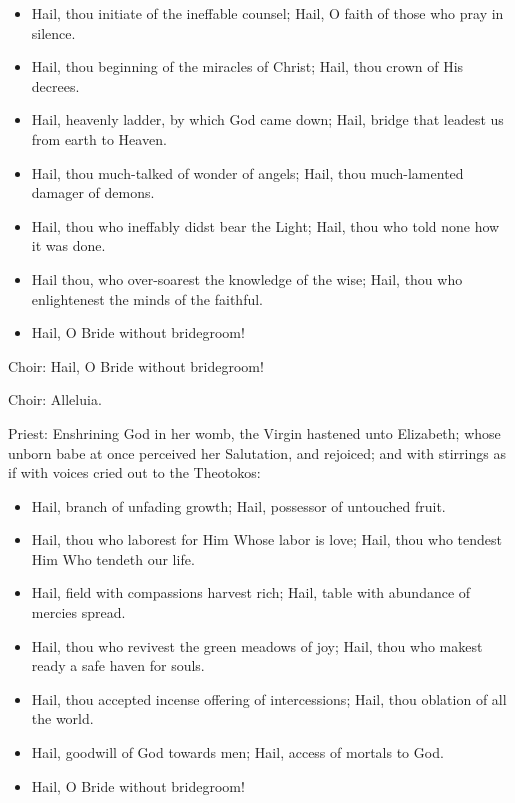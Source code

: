\documentclass[twoside, letterpaper, 12pt]{report}
\begin{document}
\begin{itemize}[label=\tiny{+},leftmargin=*]
\item Hail, thou initiate of the ineffable counsel; Hail, O faith of those who pray in silence.
\item Hail, thou beginning of the miracles of Christ; Hail, thou crown of His decrees.
\item Hail, heavenly ladder, by which God came down; Hail, bridge that leadest us from earth to
Heaven.
\item Hail, thou much-talked of wonder of angels; Hail, thou much-lamented damager of demons.
\item Hail, thou who ineffably didst bear the Light; Hail, thou who told none how it was done.
\item Hail thou, who over-soarest the knowledge of the wise; Hail, thou who enlightenest the minds
of the faithful.
\item Hail, O Bride without bridegroom! 
\end{itemize}

Choir: Hail, O Bride without bridegroom!


Choir: Alleluia. 

Priest: Enshrining God in her womb, the Virgin hastened unto Elizabeth; whose unborn babe
at once perceived her Salutation, and rejoiced; and with stirrings as if with voices cried
out to the Theotokos:

\begin{itemize}[label=\tiny{+},leftmargin=*]
\item Hail, branch of unfading growth; Hail, possessor of untouched fruit.
\item Hail, thou who laborest for Him Whose labor is love; Hail, thou who tendest Him Who tendeth
our life.
\item Hail, field with compassions harvest rich; Hail, table with abundance of mercies spread.
\item Hail, thou who revivest the green meadows of joy; Hail, thou who makest ready a safe haven
for souls.
\item Hail, thou accepted incense offering of intercessions; Hail, thou oblation of all the world.
\item Hail, goodwill of God towards men; Hail, access of mortals to God.
\item Hail, O Bride without bridegroom! 
\end{itemize}
\end{document}
